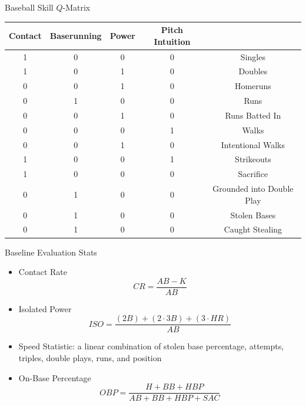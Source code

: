 \documentclass{beamer}
\theoremstyle{definition}
\begin{document}
\begin{frame}{Baseball Skill $Q$-Matrix}
\scriptsize
\begin{tabular}{cccc|c}
     Contact & Baserunning & Power & Pitch Intuition &  \\
     \hline
1 & 0 & 0 & 0 & Singles\\
1 & 0 & 1 & 0 & Doubles\\
0 & 0 & 1 & 0 & Homeruns\\
0 & 1 & 0 & 0 & Runs\\
0 & 0 & 1 & 0 & Runs Batted In\\
0 & 0 & 0 & 1 & Walks\\
0 & 0 & 1 & 0 & Intentional Walks\\
1 & 0 & 0 & 1 & Strikeouts\\
1 & 0 & 0 & 0 & Sacrifice\\
0 & 1 & 0 & 0 & Grounded into Double Play\\
0 & 1 & 0 & 0 & Stolen Bases\\
0 & 1 & 0 & 0 & Caught Stealing\\
\end{tabular}
\end{frame}

\begin{frame}{Baseline Evaluation Stats}
\begin{itemize}
  \item Contact Rate
  \[CR = \frac{AB - K}{AB}\]
  \item Isolated Power
  \[ISO = \frac{(2B) + (2\cdot 3B) + (3\cdot HR)}{AB}\]
  \item Speed Statistic: a linear combination of stolen base percentage, attempts, triples, double plays, runs, and position
  \item On-Base Percentage
  \[OBP = \frac{H + BB + HBP}{AB + BB + HBP + SAC}\]
\end{itemize}
\end{frame}
\end{document}
